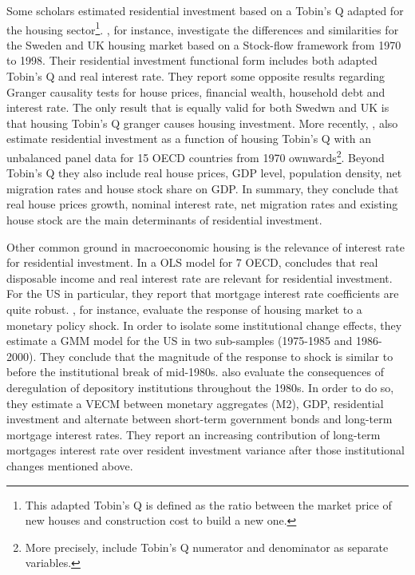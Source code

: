 \documentclass[12pt, a4paper]{article}
\begin{document}
Some scholars estimated residential investment based on a Tobin's Q adapted for the housing sector\footnote{This adapted Tobin's Q is defined as the ratio between the market price of new houses and construction cost to build a new one.}.
\textcite{barot_2002_House}, for instance, investigate the differences and similarities for the Sweden and UK housing market based on a Stock-flow framework from 1970 to 1998.
Their residential investment functional form includes both adapted Tobin's Q and real interest rate.
They report some opposite results regarding Granger causality tests for house prices, financial wealth, household debt and interest rate.
The only result that is equally valid for both Swedwn and UK is that housing Tobin's Q granger causes housing investment.
More recently, \textcite{kohlscheen_2018_Residential}, also estimate residential investment as a function of housing Tobin's Q with an unbalanced panel data for 15 OECD countries from 1970 ownwards\footnote{More precisely, \textcite{kohlscheen_2018_Residential} include Tobin's Q numerator and denominator as separate variables.}.
Beyond Tobin's Q they also include real house prices, GDP level, population density, net migration rates and house stock share on GDP.
In summary, they conclude that real house prices growth, nominal interest rate, net migration rates and existing house stock are the main determinants of residential investment.

Other common ground in macroeconomic housing is the relevance of interest rate for residential investment.
In a OLS model for 7 OECD, \textcite{egebo_1990_MODEL} concludes that real disposable income and real interest rate are relevant for residential investment.
For the US in particular, they report that mortgage interest rate coefficients are quite robust.
\textcite{mccarthyMonetaryPolicyTransmission2002}, for instance, evaluate the response of housing market to a monetary policy shock.
In order to isolate some institutional change effects, they estimate a GMM model for the US in two sub-samples (1975-1985 and 1986-2000).
They conclude that the magnitude of the response to shock is similar to before the institutional break of mid-1980s.
\textcite{gauger_residential_2003} also evaluate the consequences of deregulation of depository institutions throughout the 1980s.
In order to do so, they estimate a VECM between monetary aggregates (M2), GDP, residential investment and alternate between short-term government bonds and long-term mortgage interest rates.
They report an increasing contribution of long-term mortgages interest rate over resident investment variance after those institutional changes mentioned above.
\end{document}

